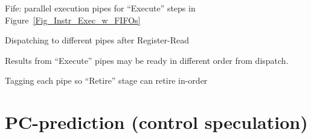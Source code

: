 Fife: parallel execution pipes for ``Execute'' steps in
Figure~\ref{Fig_Instr_Exec_w_FIFOs}

\begin{tightlist}

  \item Dispatching to different pipes after Register-Read

  \item Results from ``Execute'' pipes may be ready in different order from dispatch.

  \item   Tagging each pipe so ``Retire'' stage can retire in-order
\end{tightlist}



\section{PC-prediction (control speculation)}

